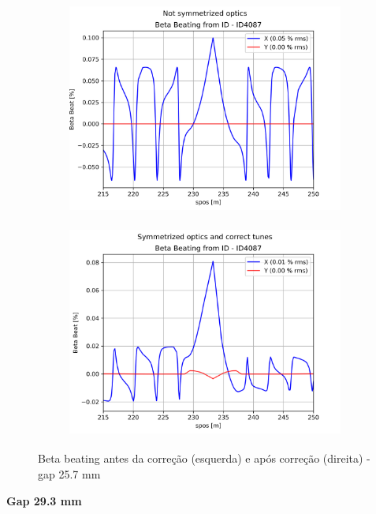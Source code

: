 \documentclass[a4paper,12pt]{article}
\begin{document}
\begin{figure}[H]
\begin{subfigure}{0.5\textwidth}
\includegraphics[width=0.9\linewidth, height=7cm]{figs/phase25 gap25 uncorrected-optics.png} 
\label{fig:subim12525}
\end{subfigure}
\begin{subfigure}{0.5\textwidth}
\includegraphics[width=0.9\linewidth, height=7cm]{figs/phase25 gap25 corrected-optics-tunes.png}
\label{fig:subim22525}
\end{subfigure}
\caption{Beta beating antes da correção (esquerda) e após correção (direita) - gap 25.7 mm}
\label{fig:bb25_25}
\end{figure}

\textbf{Gap 29.3 mm} \\
\end{document}
